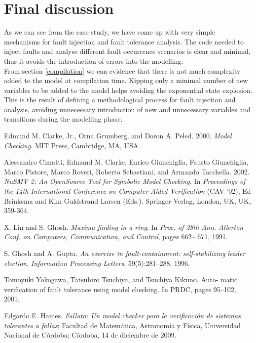 \documentclass[12pt]{article}
\begin{document}
\section{Final discussion}
As we can see from the case study, we have come up with very simple mechanisms for fault injection and fault tolerance analysis. The code needed to inject faults and analyse different fault occurrence scenarios is clear and minimal, thus it avoids the introduction of errors into the modelling.\\
From section \ref{compilation} we can evidence that there is not much complexity added to the model at compilation time. Kipping only a minimal number of new variables to be added to the model helps avoiding the exponential state explosion. This is the result of defining a methodological process for fault injection and analysis, avoiding unnecessary introduction of new and unnecessary variables and transitions during the modelling phase.\\



%
%
\begin{thebibliography}{9}

    Edmund M. Clarke, Jr., Orna Grumberg, and Doron A. Peled. 2000.
    \emph{Model Checking}. MIT Press, Cambridge, MA, USA. 

    Alessandro Cimatti, Edmund M. Clarke, Enrico Giunchiglia, Fausto
    Giunchiglia, Marco Pistore, Marco Roveri, Roberto Sebastiani, and Armando
    Tacchella. 2002. \emph{NuSMV 2: An OpenSource Tool for Symbolic Model
    Checking.} In \emph{Proceedings of the 14th International Conference on
    Computer Aided Verification} (CAV '02), Ed Brinksma and Kim Guldstrand
    Larsen (Eds.). Springer-Verlag, London, UK, UK, 359-364. 

    X. Lin and S. Ghosh. \emph{Maxima finding in a ring}. In \emph{Proc. of 28th Ann.
    Allerton Conf. on Computers, Communication, and Control}, pages 662–
    671, 1991.

    S. Ghosh and A. Gupta. \emph{An exercise in fault-containment: self-stabilizing
    leader election}. \emph{Information Processing Letters}, 59(5):281–288, 1996.

    Tomoyuki Yokogawa, Tatsuhiro Tsuchiya, and Tsuchiya Kikuno. Auto-
    matic verification of fault tolerance using model checking. In PRDC,
    pages 95–102, 2001.
    
    Edgardo E. Hames. \emph{Falluto: Un model checker para la verificaci\'on de sistemas tolerantes a fallas}; Facultad de Matem\'atica, Astronom\'ia y F\'isica, Universidad Nacional de C\'ordoba; C\'ordoba, 14 de diciembre de 2009.

\end{thebibliography}
\end{document}
